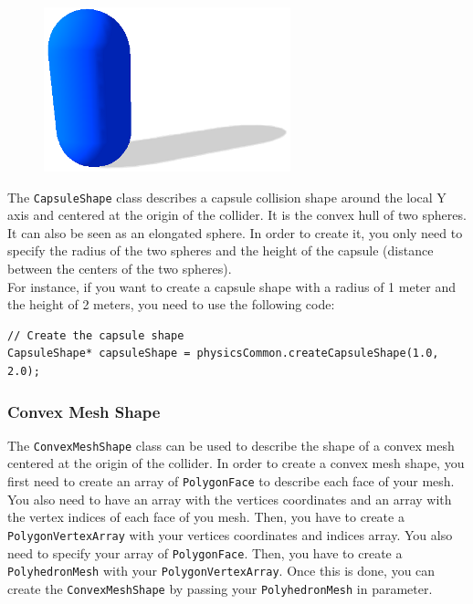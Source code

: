 \documentclass[a4paper,12pt]{article}
\begin{document}
    \begin{figure}[h]
        \centering
        \includegraphics{capsuleshape.png}
        \label{fig:capsuleshape}
    \end{figure}

    The \texttt{CapsuleShape} class describes a capsule collision shape around the local Y axis and centered at the origin of the collider.
    It is the convex hull of two spheres. It can also be seen as an elongated sphere. In order to create it, you only need to specify the
    radius of the two spheres and the height of the capsule (distance between the centers of the two spheres).  \\

    For instance, if you want to create a capsule shape with a radius of 1 meter and the height of 2 meters, you need to use the following code: \\

    \begin{lstlisting}
// Create the capsule shape
CapsuleShape* capsuleShape = physicsCommon.createCapsuleShape(1.0, 2.0);
  \end{lstlisting}

    \vspace{0.6cm}

    \subsubsection{Convex Mesh Shape}


    \begin{sloppypar}
    The \texttt{ConvexMeshShape} class can be used to describe the shape of a convex mesh centered at the origin of the collider. In order to create a
    convex mesh shape, you first need to create an array of \texttt{PolygonFace} to describe each face of your mesh. You also need to have an array with
    the vertices coordinates and an array with the vertex indices of each face of you mesh. Then, you have to create a \texttt{PolygonVertexArray} with
    your vertices coordinates and indices array. You also need to specify your array of \texttt{PolygonFace}. Then, you have to create a
    \texttt{PolyhedronMesh} with your \texttt{PolygonVertexArray}. Once this is done, you can create the \texttt{ConvexMeshShape} by passing your
    \texttt{PolyhedronMesh} in parameter. \\
    \end{sloppypar}
\end{document}
